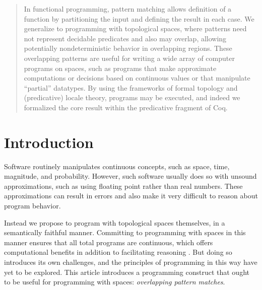 \documentclass[conference]{IEEEtran}
\begin{document}
\begin{abstract}
In functional programming, pattern matching allows definition of a function by partitioning the input and defining the result in each case. We generalize to programming with topological spaces, where patterns need not represent decidable predicates and also may overlap, allowing potentially nondeterministic behavior in overlapping regions. These overlapping patterns are useful for writing a wide array of computer programs on spaces, such as programs that make approximate computations or decisions based on continuous values or that manipulate ``partial'' datatypes. By using the frameworks of formal topology and (predicative) locale theory, programs may be executed, and indeed we formalized the core result within the predicative fragment of Coq.
\end{abstract}





%
\IEEEpeerreviewmaketitle


\section{Introduction}

Software routinely manipulates continuous concepts, such as space, time, magnitude, and probability. However, such software usually does so with unsound approximations, such as using floating point rather than real numbers. These approximations can result in errors and also make it very difficult to reason about program behavior.

Instead we propose to program with topological spaces themselves, in a semantically faithful manner. Committing to programming with spaces in this manner ensures that all total programs are continuous, which offers computational benefits in addition to facilitating reasoning \cite{lamcra, escardoinfinite, escardo2004, simpson1998lazy}. But doing so introduces its own challenges, and the principles of programming in this way have yet to be explored. This article introduces a programming construct that ought to be useful for programming with spaces: \emph{overlapping pattern matches}.
\end{document}
